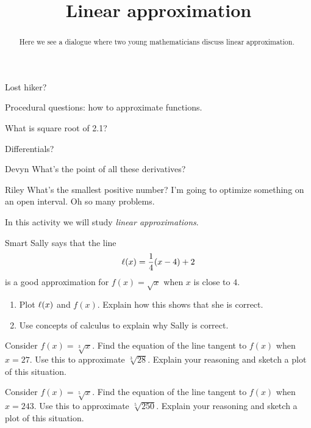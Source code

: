 \documentclass{ximera}
\title[Break-Ground:]{Linear approximation}
\begin{document}
\begin{abstract}
Here we see a dialogue where two young mathematicians discuss linear approximation.
\end{abstract}
\maketitle

Lost hiker?

Procedural questions: how to approximate functions.

What is square root of 2.1?

Differentials?


\begin{dialogue}
\item[Devyn] 
What's the point of all these derivatives?
\item[Riley]
What's the smallest positive number?
I'm going to optimize something on an open interval.  Oh so many problems.
\end{dialogue}


In this activity we will study \textit{linear approximations}. 

\begin{problem}
Smart Sally says that the line
\[
\ell(x) = \frac{1}{4}(x-4)+2
\]
is a good approximation for $f(x) = \sqrt{x}$ when $x$ is close to
$4$. 
\begin{enumerate}
\item Plot $\ell(x)$ and $f(x)$. Explain how this shows that she is
correct.
\item Use concepts of calculus to explain why Sally is correct. 
\end{enumerate}
\end{problem}

\begin{problem}
Consider $f(x) = \sqrt[3]{x}$. Find the equation of the line tangent
to $f(x)$ when $x= 27$. Use this to approximate
$\sqrt[3]{28}$. Explain your reasoning and sketch a plot of this
situation.
\end{problem}

\begin{problem}
Consider $f(x) = \sqrt[5]{x}$. Find the equation of the line tangent
to $f(x)$ when $x= 243$. Use this to approximate
$\sqrt[5]{250}$. Explain your reasoning and sketch a plot of this
situation.
\end{problem}
\end{document}
